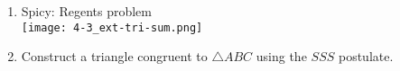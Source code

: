 \documentclass[12pt, oneside]{article}
\begin{document}
\begin{enumerate}
\newpage

  \item Spicy: Regents problem\\
    \texttt{[image: 4-3\_ext-tri-sum.png]}
    \vspace{2cm}
    
  \item Construct a triangle congruent to $\triangle ABC$ using the $SSS$ postulate.\\[2cm]


\end{enumerate}
\end{document}
